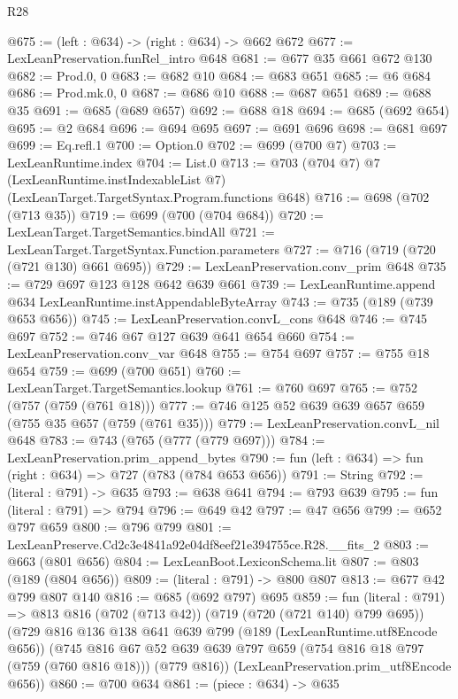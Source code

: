 \begin{lexlean}{R28}
\begin{coremodule}
@675 := (left : @634) -> (right : @634) -> @662 @672
@677 := LexLeanPreservation.funRel_intro @648
@681 := @677 @35 @661 @672 @130
@682 := Prod.{0, 0}
@683 := @682 @10
@684 := @683 @651
@685 := @6 @684
@686 := Prod.mk.{0, 0}
@687 := @686 @10
@688 := @687 @651
@689 := @688 @35
@691 := @685 (@689 @657)
@692 := @688 @18
@694 := @685 (@692 @654)
@695 := @2 @684
@696 := @694 @695
@697 := @691 @696
@698 := @681 @697
@699 := Eq.refl.{1}
@700 := Option.{0}
@702 := @699 (@700 @7)
@703 := LexLeanRuntime.index
@704 := List.{0}
@713 := @703
    (@704 @7)
    @7
    (LexLeanRuntime.instIndexableList @7)
    (LexLeanTarget.TargetSyntax.Program.functions @648)
@716 := @698 (@702 (@713 @35))
@719 := @699 (@700 (@704 @684))
@720 := LexLeanTarget.TargetSemantics.bindAll
@721 := LexLeanTarget.TargetSyntax.Function.parameters
@727 := @716 (@719 (@720 (@721 @130) @661 @695))
@729 := LexLeanPreservation.conv_prim @648
@735 := @729 @697 @123 @128 @642 @639 @661
@739 := LexLeanRuntime.append @634 LexLeanRuntime.instAppendableByteArray
@743 := @735 (@189 (@739 @653 @656))
@745 := LexLeanPreservation.convL_cons @648
@746 := @745 @697
@752 := @746 @67 @127 @639 @641 @654 @660
@754 := LexLeanPreservation.conv_var @648
@755 := @754 @697
@757 := @755 @18 @654
@759 := @699 (@700 @651)
@760 := LexLeanTarget.TargetSemantics.lookup
@761 := @760 @697
@765 := @752 (@757 (@759 (@761 @18)))
@777 := @746 @125 @52 @639 @639 @657 @659 (@755 @35 @657 (@759 (@761 @35)))
@779 := LexLeanPreservation.convL_nil @648
@783 := @743 (@765 (@777 (@779 @697)))
@784 := LexLeanPreservation.prim_append_bytes
@790 := fun (left : @634) => fun (right : @634) => @727 (@783 (@784 @653 @656))
@791 := String
@792 := (literal : @791) -> @635
@793 := @638 @641
@794 := @793 @639
@795 := fun (literal : @791) => @794
@796 := @649 @42
@797 := @47 @656
@799 := @652 @797 @659
@800 := @796 @799
@801 := LexLeanPreserve.Cd2c3e4841a92e04df8eef21e394755ce.R28.__fits_2
@803 := @663 (@801 @656)
@804 := LexLeanBoot.LexiconSchema.lit
@807 := @803 (@189 (@804 @656))
@809 := (literal : @791) -> @800 @807
@813 := @677 @42 @799 @807 @140
@816 := @685 (@692 @797) @695
@859 := fun (literal : @791) =>
  @813
    @816
    (@702 (@713 @42))
    (@719 (@720 (@721 @140) @799 @695))
    (@729
      @816
      @136
      @138
      @641
      @639
      @799
      (@189 (LexLeanRuntime.utf8Encode @656))
      (@745
        @816
        @67
        @52
        @639
        @639
        @797
        @659
        (@754 @816 @18 @797 (@759 (@760 @816 @18)))
        (@779 @816))
      (LexLeanPreservation.prim_utf8Encode @656))
@860 := @700 @634
@861 := (piece : @634) -> @635

\end{coremodule}
\end{lexlean}
